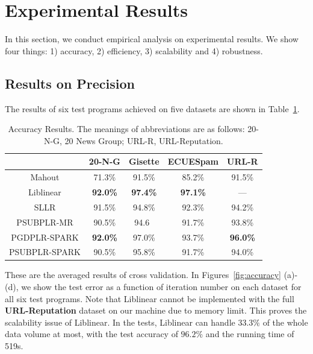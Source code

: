 \documentclass[10pt, conference, compsocconf]{IEEEtran}
\begin{document}
\section{Experimental Results} \label{sec:experiment}
In this section, we conduct empirical analysis on experimental results.
We show four things: 1) accuracy, 2) efficiency, 3) scalability and 4) robustness.

\subsection{Results on Precision} \label{sec:precision}
The results of six test programs achieved on five datasets are shown in Table~\ref{tab:table3}.
%
\begin{table}[h]
\centering
\caption{Accuracy Results. The meanings of abbreviations are as follows: 20-N-G, 20 News Group; URL-R, URL-Reputation.}\label{tab:table3}\vspace{-0.3cm}
\begin{tabular}{|c|c|c|c|c|}
\hline
           & 20-N-G & Gisette & ECUESpam & URL-R \\
\hline
Mahout     & 71.3\% & 91.5\% & 85.2\% & 91.5\% \\
\hline
Liblinear  & \textbf{92.0\%} & \textbf{97.4\%} & \textbf{97.1\%} & --- \\
\hline
SLLR       & 91.5\% & 94.8\% & 92.3\% & 94.2\% \\
\hline
PSUBPLR-MR & 90.5\% & 94.6\ & 91.7\% & 93.8\% \\
\hline
PGDPLR-SPARK & \textbf{92.0\%} & 97.0\% & 93.7\% & \textbf{96.0\%} \\
\hline
PSUBPLR-SPARK & 90.5\% & 95.8\% & 91.7\% & 94.0\% \\
\hline
\end{tabular}
\end{table}
%
These are the averaged results of cross validation.
In Figures~\ref{fig:accuracy} (a)-(d), we show the test error as a function of iteration number on each dataset for all six test programs.
Note that Liblinear cannot be implemented with the full \textbf{URL-Reputation} dataset on our machine due to memory limit.
This proves the scalability issue of Liblinear.
In the tests, Liblinear can handle $33.3\%$ of the whole data volume at most, with the test accuracy of $96.2\%$ and the running time of 519s.
%
\end{document}
